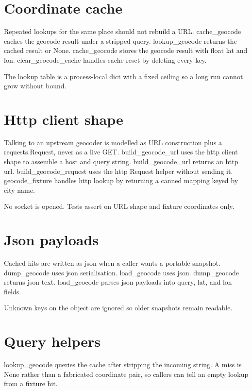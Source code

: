 \section{Coordinate cache}

Repeated lookups for the same place should not rebuild a URL. cache_geocode caches the geocode result under a stripped query. lookup_geocode returns the cached result or None. cache_geocode stores the geocode result with float lat and lon. clear_geocode_cache handles cache reset by deleting every key.

The lookup table is a process-local dict with a fixed ceiling so a long run cannot grow without bound.

\section{Http client shape}

Talking to an upstream geocoder is modelled as URL construction plus a requests.Request, never as a live GET. build_geocode_url uses the http client shape to assemble a host and query string. build_geocode_url returns an http url. build_geocode_request uses the http Request helper without sending it. geocode_fixture handles http lookup by returning a canned mapping keyed by city name.

No socket is opened. Tests assert on URL shape and fixture coordinates only.

\section{Json payloads}

Cached hits are written as json when a caller wants a portable snapshot. dump_geocode uses json serialisation. load_geocode uses json. dump_geocode returns json text. load_geocode parses json payloads into query, lat, and lon fields.

Unknown keys on the object are ignored so older snapshots remain readable.

\section{Query helpers}

lookup_geocode queries the cache after stripping the incoming string. A miss is None rather than a fabricated coordinate pair, so callers can tell an empty lookup from a fixture hit.
